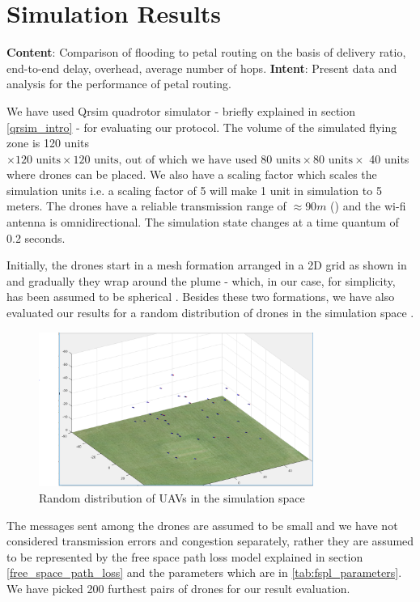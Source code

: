 \chapter{Simulation Results}
\textbf{Content}: Comparison of flooding to petal routing on the basis of delivery ratio, end-to-end delay, overhead, average number of hops. 
\textbf{Intent}:  Present data and analysis for the performance of petal routing.

We have used Qrsim quadrotor simulator \cite{denardi2013rn} - briefly explained in section \ref{qrsim_intro} - for evaluating our protocol. The volume of the simulated flying zone is 120 units $ \times \text{120 units} \times \text{120 units, out of which we have used 80 units} \times \text{80 units}\times $ 40 units where drones can be placed. We also have a scaling factor which scales the simulation units i.e. a scaling factor of 5 will make 1 unit in simulation to 5 meters. The drones have a reliable transmission range of $\approx 90 m$ () and the wi-fi antenna is omnidirectional. The simulation state changes at a time quantum of 0.2 seconds.

Initially, the drones start in a mesh formation arranged in a 2D grid as shown in  and gradually they wrap around the plume - which, in our case, for simplicity, has been assumed to be spherical . Besides these two formations, we have also evaluated our results for a random distribution of drones in the simulation space .

\begin{figure}[hbtp]
\centering
\includegraphics[width=0.8\textwidth]{ncsuthesis-0.6/Chapter-5/figs/random_drone_locations}
\caption{Random distribution of UAVs in the simulation space}
\label{fig:random_formation}
\end{figure}

The messages sent among the drones are assumed to be small and we have not considered transmission errors and congestion separately, rather they are assumed to be represented by the free space path loss model explained in section \ref{free_space_path_loss} and the parameters which are in \ref{tab:fspl_parameters}. We have picked 200 furthest pairs of drones for our result evaluation. 

